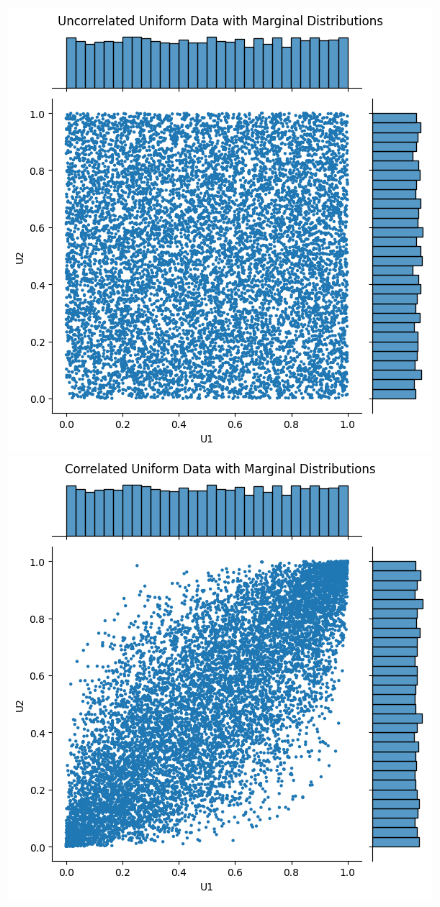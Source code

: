 \begin{figure}
\begin{minipage}{0.4\textwidth}
        \subcaption{}
    \end{minipage}
    \vfill
    \begin{minipage}{0.4\textwidth}
        \centering
        \includegraphics[width=\textwidth]{3Theory/pictures/UncorrelatedUniformScatter.png}
        \subcaption{}
    \end{minipage}
    \hfill
    \begin{minipage}{0.4\textwidth}
        \centering
        \includegraphics[width=\textwidth]{3Theory/pictures/CorrelatedUnoformScatter.png}

\end{minipage}
\end{figure}
